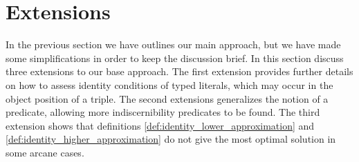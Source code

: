 \section{Extensions}
\label{sec:extensions}

In the previous section we have outlines our main approach,
  but we have made some simplifications in order to keep the discussion brief.
In this section discuss three extensions to our base approach.
The first extension provides further details on how to assess
  identity conditions of typed literals, which may occur in the object
  position of a triple.
The second extensions generalizes the notion of a predicate,
  allowing more indiscernibility predicates to be found.
The third extension shows that definitions
  \ref{def:identity_lower_approximation} and
  \ref{def:identity_higher_approximation}
  do not give the most optimal solution in some arcane cases.





